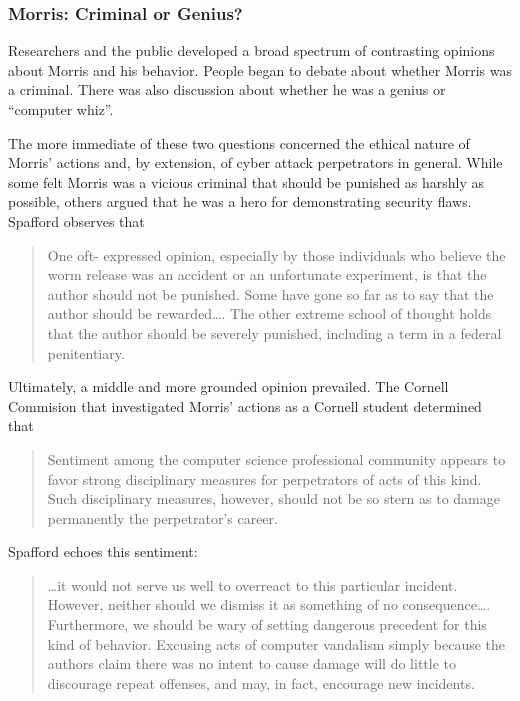 \subsubsection*{Morris: Criminal or Genius?}
Researchers and the
public developed a broad spectrum of contrasting opinions about Morris and his
behavior. People began to debate about whether Morris was a criminal.
There was also discussion about whether he was a genius or ``computer whiz''. 

The more immediate of these two questions concerned the ethical
nature of Morris' actions and, by extension, of cyber attack perpetrators in
general. While some felt Morris was a vicious criminal that should be
punished as harshly as possible, others argued that he was a hero for
demonstrating security flaws. Spafford\cite{spafford_crisis_1989} observes that 
\begin{quote}
One oft- expressed opinion, especially by those individuals who believe the
worm release was an accident or an unfortunate experiment, is that the author
should not be punished. Some have gone so far as to say that the author should
be rewarded\ldots.
The other extreme school of thought holds that the author should be severely
punished, including a term in a federal penitentiary.
\end{quote}

Ultimately, a middle and more grounded opinion prevailed. The Cornell
Commision\cite{eisenberg_cornell_1989} that investigated Morris' actions as a
Cornell student determined that
\begin{quote}
Sentiment among the computer science professional community appears to favor
strong disciplinary measures for perpetrators of acts of this kind. Such
disciplinary measures, however, should not be so stern as to damage permanently
the perpetrator's career.
\end{quote}

Spafford\cite{spafford_crisis_1989} echoes this sentiment:
\begin{quote}
\ldots it would not serve us well to overreact to this particular incident.
However, neither should we dismiss it as something of no consequence\ldots.
Furthermore, we should be wary of setting dangerous precedent for this kind of
behavior. Excusing acts of computer vandalism simply because the authors claim
there was no intent to cause damage will do little to discourage repeat
offenses, and may, in fact, encourage new incidents.
\end{quote}

